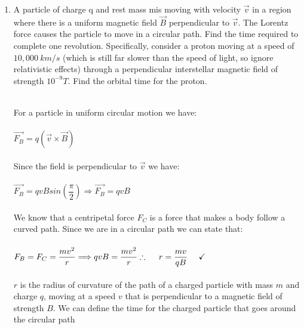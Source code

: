\documentclass[fleqn]{article}
\begin{document}
\begin{enumerate}
\begin{enumerate}
    \end{enumerate}

    \item A particle of charge q and rest mass mis moving with velocity $\overrightarrow{v}$ in a region where there 
    is a uniform magnetic field $\overrightarrow{B}$ perpendicular to $\overrightarrow{v}$. The Lorentz force causes 
    the particle to move in a circular path. Find the time required to complete one revolution. Specifically, consider
    a proton moving at a speed of $10,000 ~ km/s$ (which is still far slower than the speed of light, so ignore relativistic 
    effects) through a perpendicular interstellar magnetic field of strength $10^{-9} T$. Find the orbital time for the proton.

      \textcolor{hwColor}{
        \\
        For a particle in uniform circular motion we have:
        \\
        \\
        $
          \overrightarrow{F_B}=q \left(
            \overrightarrow{v} \times \overrightarrow{B}
          \right)
        $
        \\
        \\
        Since the field is perpendicular to $\overrightarrow{v}$ we have:
        \\
        \\
        $
          \overrightarrow{F_B}=q v B sin(\dfrac{\pi}{2}) \Longrightarrow \overrightarrow{F_B}=q v B
        $
        \\
        \\
        We know that a centripetal force $F_C$ is a force that makes a body follow a curved path. Since we are in a circular path we can state that:
        \\
        \\
        $
          F_B=F_C=\dfrac{mv^2}{r} \Longrightarrow q v B=\dfrac{mv^2}{r}
          \\
          \\
          \\
          \therefore ~~~~  r=\dfrac{mv}{qB} ~~~~ \checkmark
        $
        \\
        \\
        $r$ is the radius of curvature of the path of a charged particle with mass $m$ and charge $q$, moving at a speed $v$ that is 
        perpendicular to a magnetic field of strength $B$. We can define the time for the charged particle that goes around the circular path
}
\end{enumerate}
\end{document}
